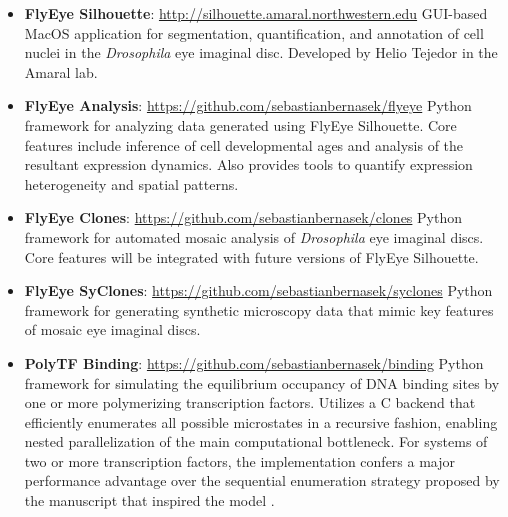 \begin{itemize}[leftmargin=*,topsep=10pt, itemsep=10pt]
  
  \item \textbf{FlyEye Silhouette}: \url{http://silhouette.amaral.northwestern.edu}
  \newline
  GUI-based MacOS application for segmentation, quantification, and annotation of cell nuclei in the \textit{Drosophila} eye imaginal disc. Developed by Helio Tejedor in the Amaral lab.
  
  \item \textbf{FlyEye Analysis}: \url{https://github.com/sebastianbernasek/flyeye}
  \newline
  Python framework for analyzing data generated using FlyEye Silhouette. Core features include inference of cell developmental ages and analysis of the resultant expression dynamics. Also provides tools to quantify expression heterogeneity and spatial patterns.
  
  \item \textbf{FlyEye Clones}: \url{https://github.com/sebastianbernasek/clones}  
  \newline
  Python framework for automated mosaic analysis of \textit{Drosophila} eye imaginal discs. Core features will be integrated with future versions of FlyEye Silhouette. 
  
  \item \textbf{FlyEye SyClones}: \url{https://github.com/sebastianbernasek/syclones}
  \newline 
  Python framework for generating synthetic microscopy data that mimic key features of mosaic eye imaginal discs.
  
  \item \textbf{PolyTF Binding}: \url{https://github.com/sebastianbernasek/binding}
  \newline 
  Python framework for simulating the equilibrium occupancy of DNA binding sites by one or more polymerizing transcription factors. Utilizes a C backend that efficiently enumerates all possible microstates in a recursive fashion, enabling nested parallelization of the main computational bottleneck. For systems of two or more transcription factors, the implementation confers a major performance advantage over the sequential enumeration strategy proposed by the manuscript that inspired the model \cite{Hope2017}.
  

\end{itemize}
